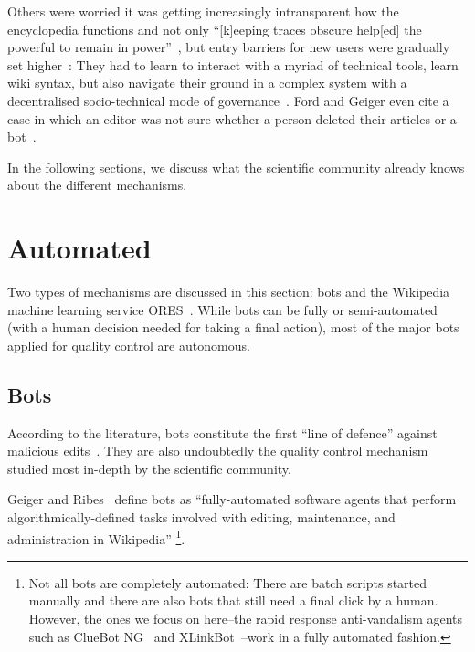 Others were worried it was getting increasingly intransparent how the encyclopedia functions and not only ``[k]eeping traces obscure help[ed] the powerful to remain in power''~\cite{ForGei2012},
but entry barriers for new users were gradually set higher~\cite{HalGeiMorRied2013}:
They had to learn to interact with a myriad of technical tools, learn wiki syntax, but also navigate their ground in a complex system with a decentralised socio-technical mode of governance~\cite{Geiger2017}.
Ford and Geiger even cite a case in which an editor was not sure whether a person deleted their articles or a bot~\cite{ForGei2012}.

In the following sections, we discuss what the scientific community already knows about the different mechanisms.

\section{Automated}

Two types of mechanisms are discussed in this section: bots and the Wikipedia machine learning service ORES~\cite{ORES}.
While bots can be fully or semi-automated (with a human decision needed for taking a final action), most of the major bots applied for quality control are autonomous.

\subsection{Bots}
\label{section:bots}
According to the literature, bots constitute the first ``line of defence'' against malicious edits~\cite{GeiHal2013}.
They are also undoubtedly the quality control mechanism studied most in-depth by the scientific community.

Geiger and Ribes~\cite{GeiRib2010} define bots as
``fully-automated software
agents that perform algorithmically-defined tasks involved
with editing, maintenance, and administration in Wikipedia''
\footnote{Not all bots are completely automated:
There are batch scripts started manually and there are also bots that still need a final click by a human.
However, the ones we focus on here–the rapid response anti-vandalism agents such as ClueBot NG~\cite{Wikipedia:ClueBotNG} and XLinkBot~\cite{Wikipedia:XLinkBot}–work in a fully automated fashion.}.

